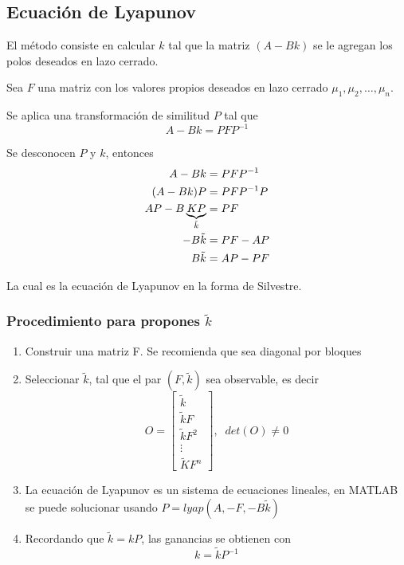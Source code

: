 \subsection{Ecuación de Lyapunov}
El método consiste en calcular \( k \) tal que la matriz \( (A-Bk) \) se le agregan los polos deseados en lazo cerrado. 

Sea \( F \) una matriz con los valores propios deseados en lazo cerrado \( \mu_{1}, \mu_{2}, \ldots, \mu_{n} \).

Se aplica una transformación de similitud \( P \) tal que 
\[
    A-Bk = PFP^{-1}
\]

Se desconocen \( P \) y \( k \), entonces
\[
    \begin{split}
        A-Bk & = PFP^{-1} \\
        (A-Bk)P & = PFP^{-1}P \\
        AP - B\underbrace{KP}_{\Tilde{k}} & = PF \\
        -B\tilde{k} & = PF-AP \\
        B\tilde{k} & 
        = AP - PF
    \end{split}
\]

La cual es la ecuación de Lyapunov en la forma de Silvestre. 
\subsubsection{Procedimiento para propones \( \tilde{k} \)}

\begin{enumerate}
    \item Construir una matriz F. Se recomienda que sea diagonal por bloques
    \item Seleccionar \( \tilde{k} \), tal que el par \( (F, \tilde{k}) \) sea observable, es decir
        \[
            O = \begin{bmatrix}
                    \tilde{k} \\
                    \tilde{k}F \\
                    \tilde{k}F^{2} \\
                    \vdots \\
                    \tilde{K}F^{n}
                \end{bmatrix}, \;\;  det(O) \not= 0
        \]
    \item La ecuación de Lyapunov es un sistema de ecuaciones lineales, en MATLAB se puede solucionar usando \( P=lyap(A, -F, -B\tilde{k}) \)
    \item Recordando que \( \tilde{k} = kP \), las ganancias se obtienen con
    \[
            k = \tilde{k}P^{-1}
    \]
\end{enumerate}

